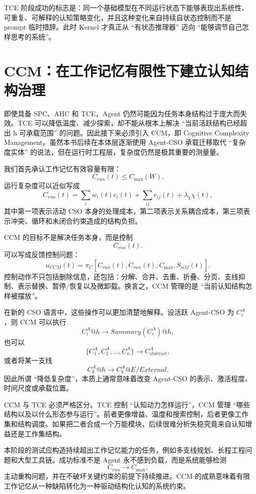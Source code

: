 TCE 阶段成功的标志是：同一个基础模型在不同运行状态下能够表现出系统性、可重复、可解释的认知策略变化，并且这种变化来自持续自状态控制而不是 prompt 临时措辞。此时 Kernel 才真正从 ``有状态推理器'' 迈向 ``能够调节自己怎样思考的系统''。

\section{CCM：在工作记忆有限性下建立认知结构治理}

即使具备 SPC、AHC 和 TCE，Agent 仍然可能因为任务本身结构过于庞大而失效。TCE 可以降低温度、减少探索，却不能从根本上解决 ``当前活跃结构已经超出 h 可承载范围'' 的问题。因此接下来必须引入 CCM，即 Cognitive Complexity Management。虽然本书后续在本体层逐渐使用 Agent-CSO 承载迁移取代 ``复杂度实体'' 的说法，但在运行时工程层，复杂度仍然是极其重要的测量量。

我们首先承认工作记忆有效容量有限：
\[
C_{run}(t)
\leq
C_{\max}(W).
\]
运行复杂度可以近似写成
\[
C_{run}(t)
=
\sum_i w_i(t)c_i(t)
+
\sum_{ij}r_{ij}(t)
+
\lambda_\chi \chi(t),
\]
其中第一项表示活动 CSO 本身的处理成本，第二项表示关系耦合成本，第三项表示冲突、循环和未闭合约束造成的结构负担。

CCM 的目标不是解决任务本身，而是控制
\[
C_{run}(t).
\]
可以写成反馈控制问题：
\[
u_{CCM}(t)
=
\pi_C
\left[
C_{run}(t),
\dot C_{run}(t),
C_{\max},
S_{self}(t)
\right].
\]
控制动作不只包括删除信息，还包括：分解、合并、去重、折叠、分页、支线抑制、表示替换、暂停/恢复以及微卸载。换言之，CCM 管理的是 ``当前认知结构怎样被摆放''。

在新的 CSO 语言中，这些操作可以更加清楚地解释。设活跃 Agent-CSO 为 $C_i^A$，则 CCM 可以执行
\[
C_i^A@h
\rightarrow
Summary(C_i^A)@h,
\]
也可以
\[
\{C_1^A,C_2^A,\ldots,C_n^A\}
\rightarrow
C_{\mathrm{abstract}}^A,
\]
或者将某一支线
\[
C_k^A@h
\rightarrow
C_k^A@E/External.
\]
因此所谓 ``降低复杂度''，本质上通常意味着改变 Agent-CSO 的表示、激活程度、时间尺度或承载位置。

CCM 与 TCE 必须严格区分。TCE 控制 ``认知动力怎样运行''，CCM 管理 ``哪些结构以及以什么形态参与运行''。前者更像增益、温度和搜索控制，后者更像工作集和结构调度。如果把二者合成一个万能模块，后续很难分析失稳究竟来自认知增益还是工作集结构。

本阶段的测试应构造持续超出工作记忆能力的任务，例如多支线规划、长程工程问题和大型工具链。成功标准不是 Agent 永不感到负载，而是系统能够检测
\[
C_{run}\rightarrow C_{\max},
\]
主动重构问题，并在不破坏关键约束的前提下持续推进。CCM 的成熟意味着有限工作记忆从一种缺陷转化为一种驱动结构化认知的系统约束。

